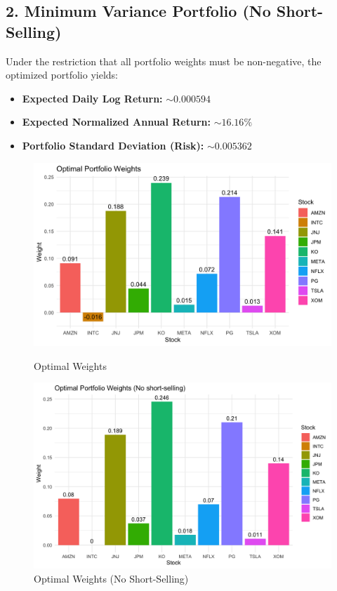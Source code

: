 \documentclass[12pt]{article}
\begin{document}
\subsection*{2.  Minimum Variance Portfolio (No Short-Selling)}
Under the restriction that all portfolio weights must be non-negative, the optimized portfolio yields:
\begin{itemize}
    \item \textbf{Expected Daily Log Return:} $\sim 0.000594 $
    \item \textbf{Expected Normalized Annual Return:} $\sim 16.16\%$
    \item \textbf{Portfolio Standard Deviation (Risk):} $\sim 0.005362$
\end{itemize}
\begin{figure}[h]
    \centering
    \begin{minipage}{0.48\textwidth}
        \centering
        \includegraphics[width=\linewidth]{Findings_Yutong/weights.png}
        \caption{Optimal Weights}
        \label{opt weights}
    \end{minipage}
    \hfill
    \begin{minipage}{0.48\textwidth}
        \centering
        \includegraphics[width=\linewidth]{Findings_Yutong/portfolio_weights_plot.png}
        \caption{Optimal Weights (No Short-Selling)}
        \label{opt weights no}
    \end{minipage}
\end{figure}
\end{document}
